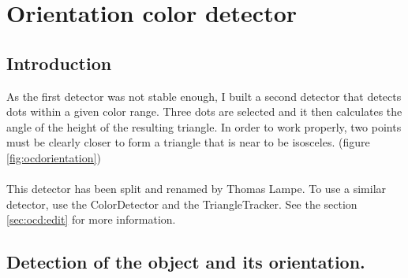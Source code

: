 \section[Orientation color detector (Triangle tracker)]{Orientation color detector}
\label{sec:ocd}

\subsection{Introduction}
\label{sec:ocd:intro}

As the first detector was not stable enough, I built a second detector 
that detects dots within a given color range. Three dots are selected 
and it then calculates the angle of the height of the resulting triangle. 
In order to work properly, two points must be clearly closer to form a 
triangle that is near to be isosceles. (figure \ref{fig:ocdorientation})
\\
\\
This detector has been split and renamed by Thomas Lampe. 
To use a similar detector, 
use the ColorDetector and the 
TriangleTracker. See the section \ref{sec:ocd:edit} for more 
information.

\subsection{Detection of the object and its orientation.}
\label{sec:ocd:detection}


